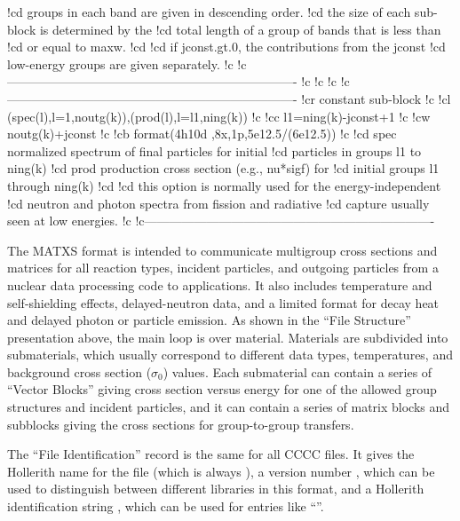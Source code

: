 \begin{ccode}
!cd                groups in each band are given in descending order.
!cd                the size of each sub-block is determined by the
!cd                total length of a group of bands that is less than
!cd                or equal to maxw.
!cd
!cd                if jconst.gt.0, the contributions from the jconst
!cd                low-energy groups are given separately.
!c
!c----------------------------------------------------------------------
!c
!c
!c
!c----------------------------------------------------------------------
!cr          constant sub-block
!c
!cl    (spec(l),l=1,noutg(k)),(prod(l),l=l1,ning(k))
!c
!cc    l1=ning(k)-jconst+1
!c
!cw    noutg(k)+jconst
!c
!cb    format(4h10d ,8x,1p,5e12.5/(6e12.5))
!c
!cd    spec        normalized spectrum of final particles for initial
!cd                particles in groups l1 to ning(k)
!cd    prod        production cross section (e.g., nu*sigf) for
!cd                initial groups l1 through ning(k)
!cd
!cd         this option is normally used for the energy-independent
!cd         neutron and photon spectra from fission and radiative
!cd         capture usually seen at low energies.
!c
!c----------------------------------------------------------------------

\end{ccode}
\normalsize
\vspace{6 pt}

The MATXS format is intended to communicate multigroup cross sections
and matrices for all reaction types, incident particles, and outgoing
particles from a nuclear data processing code to applications.  It
also includes temperature and self-shielding effects, delayed-neutron
data, and a limited format for decay heat and delayed photon or particle
emission.  As shown in the ``File Structure'' presentation above, the
main loop is over material.  Materials are subdivided into submaterials,
which usually correspond to different data types, temperatures, and
background cross section ($\sigma_0$) values.  Each submaterial can
contain a series of ``Vector Blocks'' giving cross section versus energy
for one of the allowed group structures and incident particles, and it
can contain a series of matrix blocks and subblocks giving the cross
sections for group-to-group transfers.

The ``File Identification'' record is the same for all CCCC files.  It
gives the Hollerith name for the file (which is always ),
a version number , which can be used to distinguish
between different libraries in this format, and a Hollerith
identification string , which can be used for entries
like ``''.

